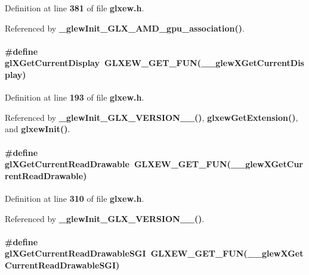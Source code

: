 Definition at line {\bf 381} of file {\bf glxew.\+h}.



Referenced by {\bf \+\_\+glew\+Init\+\_\+\+G\+L\+X\+\_\+\+A\+M\+D\+\_\+gpu\+\_\+association()}.

\paragraph[{gl\+X\+Get\+Current\+Display}]{\setlength{\rightskip}{0pt plus 5cm}\#define gl\+X\+Get\+Current\+Display~{\bf G\+L\+X\+E\+W\+\_\+\+G\+E\+T\+\_\+\+F\+UN}({\bf \+\_\+\+\_\+glew\+X\+Get\+Current\+Display})}\label{glxew_8h_a5b202b4cfd077e706f5772cb38df9048}


Definition at line {\bf 193} of file {\bf glxew.\+h}.



Referenced by {\bf \+\_\+glew\+Init\+\_\+\+G\+L\+X\+\_\+\+V\+E\+R\+S\+I\+O\+N\+\_\+\_()}, {\bf glxew\+Get\+Extension()}, and {\bf glxew\+Init()}.

\paragraph[{gl\+X\+Get\+Current\+Read\+Drawable}]{\setlength{\rightskip}{0pt plus 5cm}\#define gl\+X\+Get\+Current\+Read\+Drawable~{\bf G\+L\+X\+E\+W\+\_\+\+G\+E\+T\+\_\+\+F\+UN}({\bf \+\_\+\+\_\+glew\+X\+Get\+Current\+Read\+Drawable})}\label{glxew_8h_a0d53c59bd1a71d7312cfb4d8a67ab480}


Definition at line {\bf 310} of file {\bf glxew.\+h}.



Referenced by {\bf \+\_\+glew\+Init\+\_\+\+G\+L\+X\+\_\+\+V\+E\+R\+S\+I\+O\+N\+\_\+\_()}.

\paragraph[{gl\+X\+Get\+Current\+Read\+Drawable\+S\+GI}]{\setlength{\rightskip}{0pt plus 5cm}\#define gl\+X\+Get\+Current\+Read\+Drawable\+S\+GI~{\bf G\+L\+X\+E\+W\+\_\+\+G\+E\+T\+\_\+\+F\+UN}({\bf \+\_\+\+\_\+glew\+X\+Get\+Current\+Read\+Drawable\+S\+GI})}\label{glxew_8h_af4092e6fc468acf5b42ad86e138159d9}


